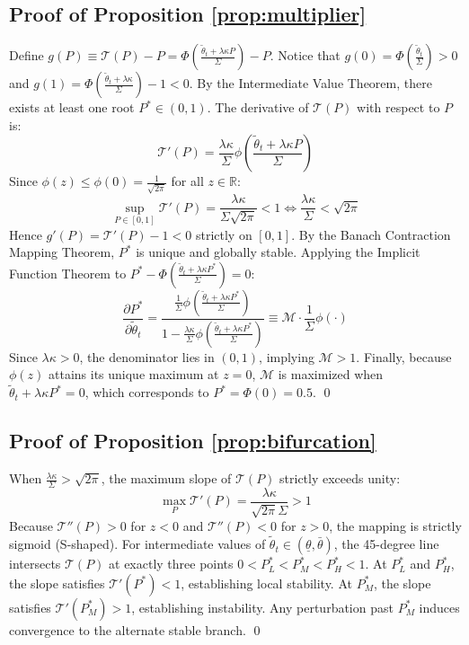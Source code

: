 \documentclass[12pt]{article}
\begin{document}
\subsection{Proof of Proposition \ref{prop:multiplier}}
\label{app:proof2}
Define $g(P) \equiv \mathcal{T}(P) - P = \Phi\left( \frac{\tilde{\theta}_t + \lambda \kappa P}{\Sigma} \right) - P$.
Notice that $g(0) = \Phi\left(\frac{\tilde{\theta}_t}{\Sigma}\right) > 0$ and $g(1) = \Phi\left(\frac{\tilde{\theta}_t + \lambda \kappa}{\Sigma}\right) - 1 < 0$. By the Intermediate Value Theorem, there exists at least one root $P^* \in (0, 1)$.
The derivative of $\mathcal{T}(P)$ with respect to $P$ is:
\begin{equation}
\mathcal{T}'(P) = \frac{\lambda \kappa}{\Sigma} \phi\left( \frac{\tilde{\theta}_t + \lambda \kappa P}{\Sigma} \right)
\end{equation}
Since $\phi(z) \le \phi(0) = \frac{1}{\sqrt{2\pi}}$ for all $z \in \mathbb{R}$:
\begin{equation}
\sup_{P \in [0, 1]} \mathcal{T}'(P) = \frac{\lambda \kappa}{\Sigma \sqrt{2\pi}} < 1 \iff \frac{\lambda \kappa}{\Sigma} < \sqrt{2\pi}
\end{equation}
Hence $g'(P) = \mathcal{T}'(P) - 1 < 0$ strictly on $[0, 1]$. By the Banach Contraction Mapping Theorem, $P^*$ is unique and globally stable.
Applying the Implicit Function Theorem to $P^* - \Phi\left(\frac{\tilde{\theta}_t + \lambda \kappa P^*}{\Sigma}\right) = 0$:
\begin{equation}
\frac{\partial P^*}{\partial \tilde{\theta}_t} = \frac{\frac{1}{\Sigma} \phi\left( \frac{\tilde{\theta}_t + \lambda \kappa P^*}{\Sigma} \right)}{1 - \frac{\lambda \kappa}{\Sigma} \phi\left( \frac{\tilde{\theta}_t + \lambda \kappa P^*}{\Sigma} \right)} \equiv \mathcal{M} \cdot \frac{1}{\Sigma}\phi(\cdot)
\end{equation}
Since $\lambda \kappa > 0$, the denominator lies in $(0, 1)$, implying $\mathcal{M} > 1$. Finally, because $\phi(z)$ attains its unique maximum at $z = 0$, $\mathcal{M}$ is maximized when $\tilde{\theta}_t + \lambda \kappa P^* = 0$, which corresponds to $P^* = \Phi(0) = 0.5$. \qed

\subsection{Proof of Proposition \ref{prop:bifurcation}}
\label{app:proof3}
When $\frac{\lambda \kappa}{\Sigma} > \sqrt{2\pi}$, the maximum slope of $\mathcal{T}(P)$ strictly exceeds unity:
\begin{equation}
\max_{P} \mathcal{T}'(P) = \frac{\lambda \kappa}{\sqrt{2\pi}\Sigma} > 1
\end{equation}
Because $\mathcal{T}''(P) > 0$ for $z < 0$ and $\mathcal{T}''(P) < 0$ for $z > 0$, the mapping is strictly sigmoid (S-shaped). For intermediate values of $\tilde{\theta}_t \in (\underline{\theta}, \bar{\theta})$, the 45-degree line intersects $\mathcal{T}(P)$ at exactly three points $0 < P_L^* < P_M^* < P_H^* < 1$. 
At $P_L^*$ and $P_H^*$, the slope satisfies $\mathcal{T}'(P^*) < 1$, establishing local stability. At $P_M^*$, the slope satisfies $\mathcal{T}'(P_M^*) > 1$, establishing instability. Any perturbation past $P_M^*$ induces convergence to the alternate stable branch. \qed
\end{document}

